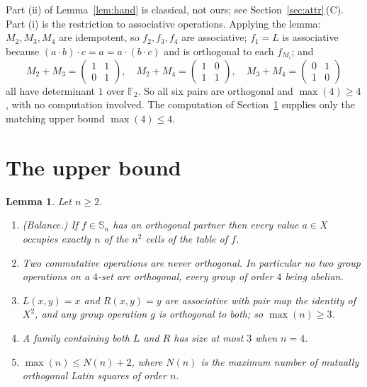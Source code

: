 \documentclass[11pt]{amsart}
\newtheorem{lemma}[theorem]{Lemma}
\theoremstyle{remark}
\theoremstyle{definition}
\newcommand{\Sops}{\mathbb S}
\newcommand{\FF}{\mathbb F}
\newcommand{\Nmols}{N}
\begin{document}
Part (ii) of Lemma~\ref{lem:hand} is classical, not ours; see Section~\ref{sec:attr}\,(C). Part (i)
is the restriction to associative operations. Applying the lemma: $M_2,M_3,M_4$ are idempotent, so
$f_2,f_3,f_4$ are associative; $f_1=L$ is associative because $(a\cdot b)\cdot c=a=a\cdot(b\cdot c)$ and is orthogonal to each
$f_{M_i}$; and
\[
M_2+M_3=\begin{pmatrix}1&1\\0&1\end{pmatrix},\quad
M_2+M_4=\begin{pmatrix}1&0\\1&1\end{pmatrix},\quad
M_3+M_4=\begin{pmatrix}0&1\\1&0\end{pmatrix}
\]
all have determinant $1$ over $\FF_2$. So all six pairs are orthogonal and $\max(4)\ge4$, with no
computation involved. The computation of Section~\ref{sec:upper} supplies only the matching upper
bound $\max(4)\le4$.

\section{The upper bound}\label{sec:upper}

\begin{lemma}\label{lem:free}
Let $n\ge2$.
\begin{enumerate}
\item[(i)] (Balance.) If $f\in\Sops_n$ has an orthogonal partner then every value $a\in X$ occupies
exactly $n$ of the $n^2$ cells of the table of $f$.
\item[(ii)] Two commutative operations are never orthogonal. In particular no two group operations
on a $4$-set are orthogonal, every group of order $4$ being abelian.
\item[(iii)] $L(x,y)=x$ and $R(x,y)=y$ are associative with pair map the identity of $X^2$, and any
group operation $g$ is orthogonal to both; so $\max(n)\ge3$.
\item[(iv)] A family containing both $L$ and $R$ has size at most $3$ when $n=4$.
\item[(v)] $\max(n)\le \Nmols(n)+2$, where $\Nmols(n)$ is the maximum number of mutually orthogonal
Latin squares of order $n$.
\end{enumerate}
\end{lemma}
\end{document}
